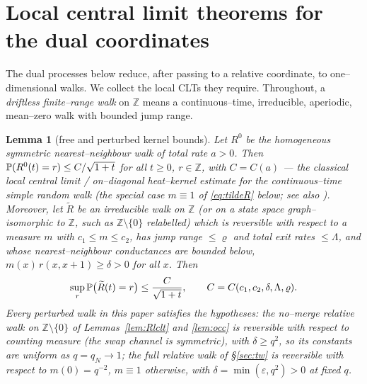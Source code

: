\documentclass[11pt]{article}
\theoremstyle{plain}
\newtheorem{lemma}[theorem]{Lemma}
\theoremstyle{definition}
\theoremstyle{remark}
\newcommand{\Z}{\mathbb{Z}}\newcommand{\R}{\mathbb{R}}\newcommand{\N}{\mathbb{N}}
\newcommand{\eps}{\varepsilon}\newcommand{\Exp}{\mathrm{Exp}}
\begin{document}
\section{Local central limit theorems for the dual coordinates}\label{sec:lclt}

The dual processes below reduce, after passing to a relative coordinate, to
one--dimensional walks. We collect the local CLTs they require. Throughout, a
\emph{driftless finite--range walk} on $\Z$ means a continuous--time, irreducible,
aperiodic, mean--zero walk with bounded jump range.

\begin{lemma}[free and perturbed kernel bounds]\label{lem:free}
Let $R^0$ be the homogeneous symmetric nearest--neighbour walk of total rate $a>0$.
Then $\mathbb{P}(R^0(t)=r)\le C/\sqrt{1+t}$ for all $t\ge0$, $r\in\Z$, with $C=C(a)$ --- the
classical local central limit / on--diagonal heat--kernel estimate for the
continuous--time simple random walk (the special case $m\equiv1$ of \eqref{eq:tildeR}
below; see also \cite{LawlerLimic}).
Moreover, let $\widetilde R$ be an irreducible walk on $\Z$ (or on a state space
graph--isomorphic to $\Z$, such as $\Z\setminus\{0\}$ relabelled) which is
\emph{reversible} with respect to a measure $m$ with $c_1\le m\le c_2$, has jump range
$\le\varrho$ and total exit rates $\le\Lambda$, and whose nearest--neighbour
conductances are bounded below, $m(x)\,r(x,x+1)\ge\delta>0$ for all $x$. Then
\begin{equation}\label{eq:tildeR}
  \sup_{r}\mathbb{P}\big(\widetilde R(t)=r\big)\le \frac{C}{\sqrt{1+t}},
  \qquad C=C(c_1,c_2,\delta,\Lambda,\varrho).
\end{equation}
Every perturbed walk in this paper satisfies the hypotheses: the no--merge relative
walk on $\Z\setminus\{0\}$ of Lemmas~\ref{lem:Rlclt} and \ref{lem:occ} is reversible
with respect to counting measure (the swap channel is symmetric), with $\delta\ge
q^2$, so its constants are uniform as $q=q_N\to1$; the full relative walk of
\S\ref{sec:tw} is reversible with respect to $m(0)=q^{-2}$, $m\equiv1$ otherwise, with
$\delta=\min(\eps,q^2)>0$ at fixed $q$.
\end{lemma}
\end{document}
